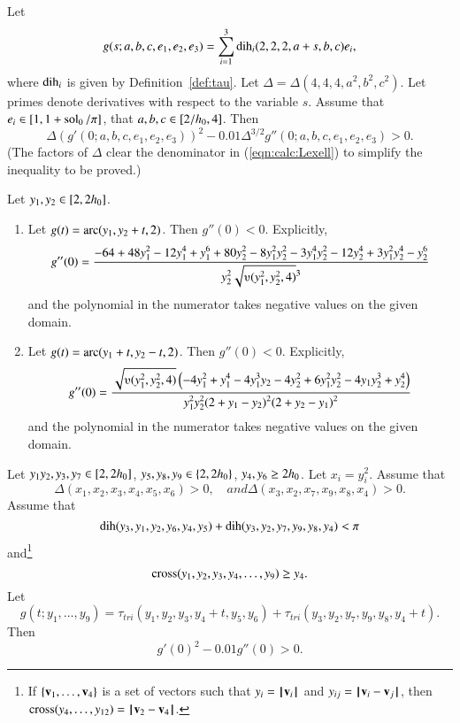 \begin{calculation}\label{calc:Lexell}
Let
\[ 
g(s;a,b,c,e_1,e_2,e_3) = \sum_{i=1}^3 \operatorname{dih}_i(2,2,2,a+s,b,c) e_i,
\] 
where $\operatorname{dih}_i$ is given by Definition~\ref{def:tau}.
Let $\Delta = \Delta(4,4,4,a^2,b^2,c^2)$.
Let primes denote derivatives with respect to the variable $s$.
Assume that
$e_i\in[1,1+\operatorname{sol}_0/\pi]$,  that
$a,b,c\in[2/{h_0},4]$.
Then
\begin{equation}\label{eqn:calc:Lexell}
  \Delta (g'(0;a,b,c,e_1,e_2,e_3))^2 
- 0.01\Delta^{3/2}g''(0;a,b,c,e_1,e_2,e_3) > 0.
\end{equation}
(The factors of $\Delta$ clear the denominator in
(\ref{eqn:calc:Lexell}) to simplify the inequality to be proved.)
\end{calculation}

\begin{calculation}\label{calc:2der}
Let $y_1,y_2\in [ 2,2{h_0}]$.  
\begin{enumerate}\wasitemize 
\item 
Let $g(t) = \operatorname{arc}(y_1,y_2+t,2)$.  Then $g''(0) < 0$.
Explicitly,
\[ 
  g''(0) = \dfrac{
    -64 + 48y_1^2 - 12 y_1^4 + y_1^6 
  + 80 y_2^2 - 8 y_1^2 y_2^2 - 3 y_1^4 y_2^2
    - 12 y_2 ^4 + 3 y_1^2 y_2^4 - y_2^6
  }{y_2^2 \sqrt{\ups(y_1^2,y_2^2,4)}^3}
\] 
and the polynomial in the numerator takes negative values on the given
domain.
\item
Let $g(t) = \operatorname{arc}(y_1+t,y_2-t,2)$.  Then $g''(0) < 0$.
Explicitly,
\[ 
  g''(0) = \dfrac{\sqrt{\ups(y_1^2,y_2^2,4)} \left(
      -4 y_1^2 + y_1^4 - 4y_1^3 y_2 - 4y_2^2 
   + 6 y_1^2 y_2^2 - 4 y_1 y_2^3 +y_2^4
    \right)}{y_1^2 y_2^2 (2+y_1-y_2)^2 (2+y_2-y_1)^2}
\] 
and the polynomial in the numerator takes negative values on the given
domain.
\end{enumerate}\wasitemize 
\end{calculation}

\begin{calculation}\label{calc:cc:qua}  %
Let $y_1y_2,y_3,y_7\in [ 2,2{h_0}]$,
$y_5,y_8,y_9\in \{2,2{h_0}\}$, $y_4,y_6\ge 2{h_0}$.
Let $x_i = y_i^2$.
Assume that
\[ 
\Delta(x_1,x_2,x_3,x_4,x_5,x_6)>0,\quad{ and }
\Delta(x_3,x_2,x_7,x_9,x_8,x_4)>0.
\] 
Assume that
\[ 
\operatorname{dih}(y_3,y_1,y_2,y_6,y_4,y_5)+\operatorname{dih}(y_3,y_2,y_7,y_9,y_8,y_4) < \pi
\] 
and\footnote{If $\{{\mathbf v}_1,\ldots,{\mathbf v}_4\}$ is a set of vectors such that
$y_i = {{\hskip0.1em|\hskip-0.15em|\hskip0.1em}{\mathbf v}_i{\hskip0.1em|\hskip-0.15em|\hskip0.1em}}$ and $y_{ij} = \norm{\v_i}{\v_j}$, then
$\op{cross}(y_4,\ldots,y_{12}) = \norm{\v_2}{\v_4}$.}
\[ 
{\operatorname{cross}}(y_1,y_2,y_3,y_4,\ldots,y_9) \ge y_4.
\] 
Let 
\[ g(t;y_1,\ldots,y_9) =
  \tau_{tri}(y_1,y_2,y_3,y_4+t,y_5,y_6)+\tau_{tri}(y_3,y_2,y_7,y_9,y_8,y_4+t).
\] 
Then \[ g'(0)^2 - 0.01 g''(0) > 0.\] 
\end{calculation}


